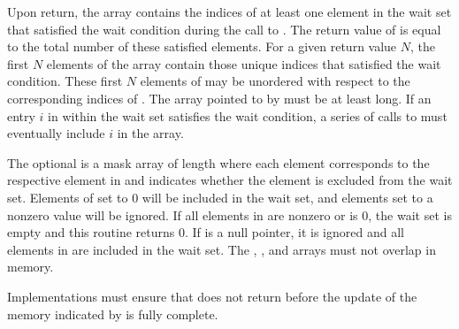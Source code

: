 \begin{apidefinition}
{    Upon return, the  array contains the indices of at least one
    element in the wait set that satisfied the wait condition during the call
    to .  The return value of
     is equal to the total
    number of these satisfied elements.  For a given return value $N$, the
    first $N$ elements of the  array contain those unique indices
    that satisfied the wait condition.  These first $N$ elements of
     may be unordered with respect to the corresponding indices of
    .  The array pointed to by  must be at least
     long.  If an entry $i$ in  within the wait set
    satisfies the wait condition, a series of calls to
     must eventually include
    $i$ in the  array.

    The optional  is a mask array of length  where each
    element corresponds to the respective element in  and indicates
    whether the element is excluded from the wait set.  Elements of
     set to 0 will be included in the wait set, and elements set to
    a nonzero value will be ignored.  If all elements in  are nonzero or
     is 0, the wait set is empty and this routine returns 0.
    If  is a null pointer, it is ignored
    and all elements in  are included in the wait set.  The
    , , and  arrays must not overlap in
    memory.

    Implementations must ensure that 
    does not return before the update of the memory indicated by  is
    fully complete.
}




\end{apidefinition}
